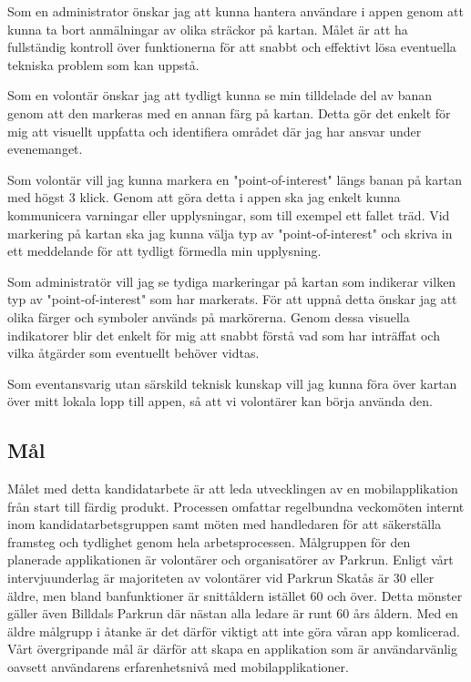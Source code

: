 \vspace{1em}
Som en administrator önskar jag att kunna hantera användare i appen genom att kunna ta bort anmälningar av olika sträckor på kartan. Målet är att ha fullständig kontroll över funktionerna för att snabbt och effektivt lösa eventuella tekniska problem som kan uppstå.

\vspace{1em}
Som en volontär önskar jag att tydligt kunna se min tilldelade del av banan genom att den markeras med en annan färg på kartan. Detta gör det enkelt för mig att visuellt uppfatta och identifiera området där jag har ansvar under evenemanget.

\vspace{1em}

Som volontär vill jag kunna markera en "point-of-interest" längs banan på kartan med högst 3 klick. Genom att göra detta i appen ska jag enkelt kunna kommunicera varningar eller upplysningar, som till exempel ett fallet träd. Vid markering på kartan ska jag kunna välja typ av "point-of-interest" och skriva in ett meddelande för att tydligt förmedla min upplysning.
\vspace{1em}

Som administratör vill jag se tydiga markeringar på kartan som indikerar vilken typ av "point-of-interest" som har markerats. För att uppnå detta önskar jag att olika färger och symboler används på markörerna. Genom dessa visuella indikatorer blir det enkelt för mig att snabbt förstå vad som har inträffat och vilka åtgärder som eventuellt behöver vidtas.

\vspace{1em}
Som eventansvarig utan särskild teknisk kunskap vill jag kunna föra över kartan över mitt lokala lopp till appen, så att vi volontärer kan börja använda den. 


\subsection{Mål}
Målet med detta kandidatarbete är att leda utvecklingen av en mobilapplikation från start till färdig produkt. Processen omfattar regelbundna veckomöten internt inom kandidatarbetsgruppen samt möten med handledaren för att säkerställa framsteg och tydlighet genom hela arbetsprocessen. Målgruppen för den planerade applikationen är volontärer och organisatörer av Parkrun. Enligt vårt intervjuunderlag är majoriteten av volontärer vid Parkrun Skatås är 30 eller äldre, men bland banfunktioner är snittåldern istället 60 och över. Detta mönster gäller även Billdals Parkrun där nästan alla ledare är runt 60 års åldern. Med en äldre målgrupp i åtanke är det därför viktigt att inte göra våran app komlicerad. Vårt övergripande mål är därför att skapa en applikation som är användarvänlig oavsett användarens erfarenhetsnivå med mobilapplikationer.



